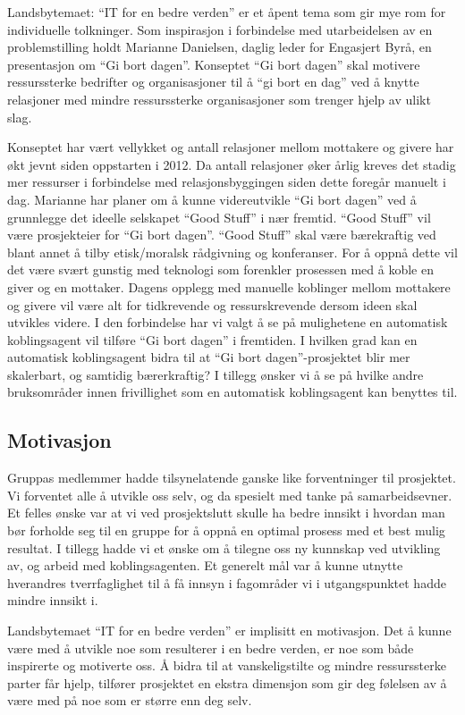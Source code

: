 Landsbytemaet: ``IT for en bedre verden” er et åpent tema som gir mye rom for individuelle tolkninger. Som inspirasjon i forbindelse med utarbeidelsen av en problemstilling holdt Marianne Danielsen, daglig leder for Engasjert Byrå, en presentasjon om ``Gi bort dagen”. Konseptet ``Gi bort dagen” skal motivere ressurssterke bedrifter og organisasjoner til å ``gi bort en dag” ved å knytte relasjoner med mindre ressurssterke organisasjoner som trenger hjelp av ulikt slag.

Konseptet har vært vellykket og antall relasjoner mellom mottakere og givere har økt jevnt siden oppstarten i 2012. Da antall relasjoner øker årlig kreves det stadig mer ressurser i forbindelse med relasjonsbyggingen siden dette foregår manuelt i dag. Marianne har planer om å kunne videreutvikle ``Gi bort dagen” ved å grunnlegge det ideelle selskapet ``Good Stuff” i nær fremtid. “Good Stuff” vil være prosjekteier for ``Gi bort dagen”. ``Good Stuff” skal være bærekraftig ved blant annet å tilby etisk/moralsk rådgivning og konferanser. For å oppnå dette vil det være svært gunstig med teknologi som forenkler prosessen med å koble en giver og en mottaker. Dagens opplegg med manuelle koblinger mellom mottakere og givere vil være alt for tidkrevende og ressurskrevende dersom ideen skal utvikles videre. I den forbindelse har vi valgt å se på mulighetene en automatisk koblingsagent vil tilføre ``Gi bort dagen” i fremtiden. I hvilken grad kan en automatisk koblingsagent bidra til at ``Gi bort dagen”-prosjektet blir mer skalerbart, og samtidig bærerkraftig? I tillegg ønsker vi å se på hvilke andre bruksområder innen frivillighet som en automatisk koblingsagent kan benyttes til.

\subsection{Motivasjon}

Gruppas medlemmer hadde tilsynelatende ganske like forventninger til prosjektet. Vi forventet alle å utvikle oss selv, og da spesielt med tanke på samarbeidsevner. Et felles ønske var at vi ved prosjektslutt skulle ha bedre innsikt i hvordan man bør forholde seg til en gruppe for å oppnå en optimal prosess med et best mulig resultat. I tillegg hadde vi et ønske om å tilegne oss ny kunnskap ved utvikling av, og arbeid med koblingsagenten. Et generelt mål var å kunne utnytte hverandres tverrfaglighet til å få innsyn i fagområder vi i utgangspunktet hadde mindre innsikt i.

Landsbytemaet ``IT for en bedre verden” er implisitt en motivasjon. Det å kunne være med å utvikle noe som resulterer i en bedre verden, er noe som både inspirerte og motiverte oss. Å bidra til at vanskeligstilte og mindre ressurssterke parter får hjelp, tilfører prosjektet en ekstra dimensjon som gir deg følelsen av å være med på noe som er større enn deg selv.

